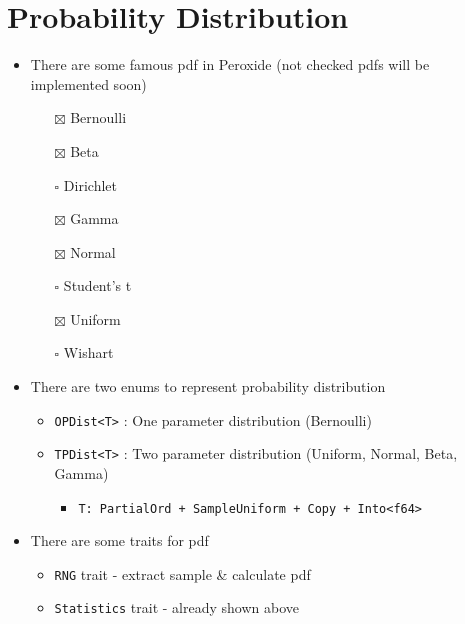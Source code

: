 \documentclass[]{book}
\providecommand{\tightlist}{%
  \setlength{\itemsep}{0pt}\setlength{\parskip}{0pt}}
\begin{document}
\hypertarget{probability-distribution}{%
\section{Probability Distribution}\label{probability-distribution}}

\begin{itemize}
\tightlist
\item
  There are some famous pdf in Peroxide (not checked pdfs will be implemented soon)

  \begin{itemize}
  \tightlist
  \item[$\boxtimes$]
    Bernoulli
  \item[$\boxtimes$]
    Beta
  \item[$\square$]
    Dirichlet
  \item[$\boxtimes$]
    Gamma
  \item[$\boxtimes$]
    Normal
  \item[$\square$]
    Student's t
  \item[$\boxtimes$]
    Uniform
  \item[$\square$]
    Wishart
  \end{itemize}
\item
  There are two enums to represent probability distribution

  \begin{itemize}
  \tightlist
  \item
    \texttt{OPDist\textless{}T\textgreater{}} : One parameter distribution (Bernoulli)
  \item
    \texttt{TPDist\textless{}T\textgreater{}} : Two parameter distribution (Uniform, Normal, Beta, Gamma)

    \begin{itemize}
    \tightlist
    \item
      \texttt{T:\ PartialOrd\ +\ SampleUniform\ +\ Copy\ +\ Into\textless{}f64\textgreater{}}
    \end{itemize}
  \end{itemize}
\item
  There are some traits for pdf

  \begin{itemize}
  \tightlist
  \item
    \texttt{RNG} trait - extract sample \& calculate pdf
  \item
    \texttt{Statistics} trait - already shown above
  \end{itemize}
\end{itemize}
\end{document}
